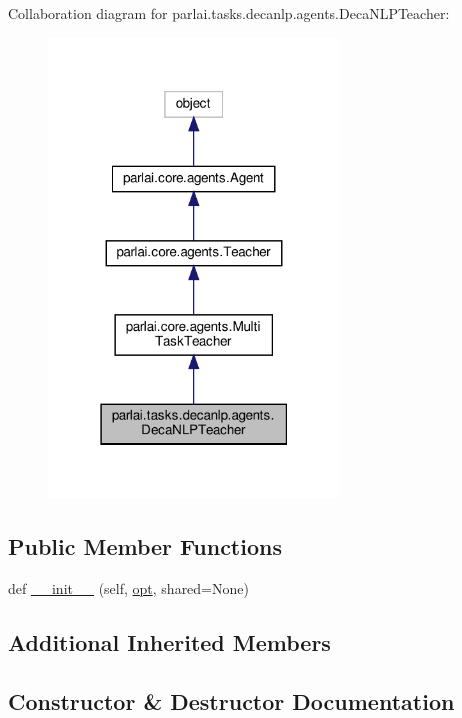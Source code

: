 Collaboration diagram for parlai.\+tasks.\+decanlp.\+agents.\+Deca\+N\+L\+P\+Teacher\+:
\nopagebreak
\begin{figure}[H]
\begin{center}
\leavevmode
\includegraphics[width=219pt]{classparlai_1_1tasks_1_1decanlp_1_1agents_1_1DecaNLPTeacher__coll__graph}
\end{center}
\end{figure}
\subsection*{Public Member Functions}
\begin{DoxyCompactItemize}
\item 
def \hyperlink{classparlai_1_1tasks_1_1decanlp_1_1agents_1_1DecaNLPTeacher_a2928fb06e1bf1f282b8019cc34e1d1ce}{\+\_\+\+\_\+init\+\_\+\+\_\+} (self, \hyperlink{classparlai_1_1core_1_1agents_1_1MultiTaskTeacher_a116b724be9c512d36f1d43cb9be86b78}{opt}, shared=None)
\end{DoxyCompactItemize}
\subsection*{Additional Inherited Members}


\subsection{Constructor \& Destructor Documentation}
\mbox{\label{classparlai_1_1tasks_1_1decanlp_1_1agents_1_1DecaNLPTeacher_a2928fb06e1bf1f282b8019cc34e1d1ce}} 
